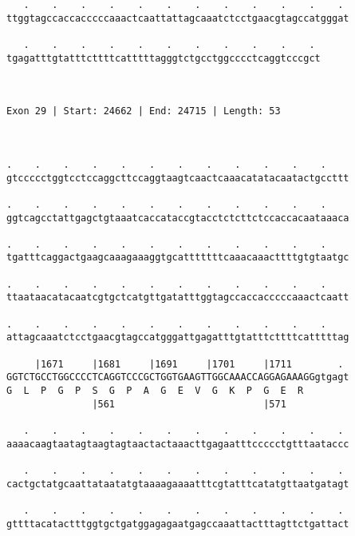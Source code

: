\documentclass{article}
\begin{document}
\begin{Verbatim}
   .    .    .    .    .    .    .    .    .    .    .    . 
ttggtagccaccacccccaaactcaattattagcaaatctcctgaacgtagccatgggat
                                                            
   .    .    .    .    .    .    .    .    .    .    . 
tgagatttgtatttcttttcatttttagggtctgcctggcccctcaggtcccgct
                                                       
                                                       
 
Exon 29 | Start: 24662 | End: 24715 | Length: 53



.    .    .    .    .    .    .    .    .    .    .    .    
gtccccctggtcctccaggcttccaggtaagtcaactcaaacatatacaatactgccttt
                                                            
.    .    .    .    .    .    .    .    .    .    .    .    
ggtcagcctattgagctgtaaatcaccataccgtacctctcttctccaccacaataaaca
                                                            
.    .    .    .    .    .    .    .    .    .    .    .    
tgatttcaggactgaagcaaagaaaggtgcatttttttcaaacaaacttttgtgtaatgc
                                                            
.    .    .    .    .    .    .    .    .    .    .    .    
ttaataacatacaatcgtgctcatgttgatatttggtagccaccacccccaaactcaatt
                                                            
.    .    .    .    .    .    .    .    .    .    .    .    
attagcaaatctcctgaacgtagccatgggattgagatttgtatttcttttcatttttag
                                                            
     |1671     |1681     |1691     |1701     |1711        . 
GGTCTGCCTGGCCCCTCAGGTCCCGCTGGTGAAGTTGGCAAACCAGGAGAAAGGgtgagt
G  L  P  G  P  S  G  P  A  G  E  V  G  K  P  G  E  R        
               |561                          |571           
  
   .    .    .    .    .    .    .    .    .    .    .    . 
aaaacaagtaatagtaagtagtaactactaaacttgagaatttccccctgtttaataccc
                                                            
   .    .    .    .    .    .    .    .    .    .    .    . 
cactgctatgcaattataatatgtaaaagaaaatttcgtatttcatatgttaatgatagt
                                                            
   .    .    .    .    .    .    .    .    .    .    .    . 
gttttacatactttggtgctgatggagagaatgagccaaattactttagttctgattact
                                                            

\end{Verbatim}
\end{document}
